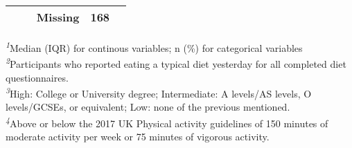\begin{table*}[!t]
\begin{tabular*}{1\linewidth}{@{\extracolsep{\fill}}lcc}
    Missing & 168 &  \\
\bottomrule
\end{tabular*}
\begin{minipage}{\linewidth}
\textsuperscript{\textit{1}}Median (IQR) for continous variables; n (\%) for categorical variables\\
\textsuperscript{\textit{2}}Participants who reported eating a typical diet yesterday for all completed diet questionnaires.\\
\textsuperscript{\textit{3}}High: College or University degree;
Intermediate: A levels/AS levels, O levels/GCSEs, or equivalent;
Low: none of the previous mentioned.\\
\textsuperscript{\textit{4}}Above or below the 2017 UK Physical activity guidelines of 150 minutes of moderate activity per week or 75 minutes of vigorous activity.\\
\end{minipage}
\end{table*}

